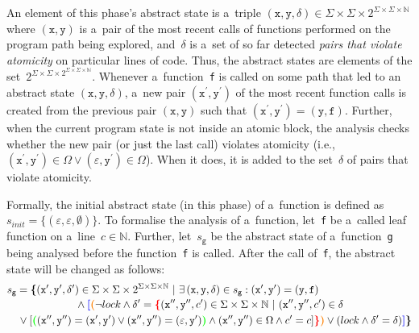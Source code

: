 An element of this phase's abstract state is a~triple $ (\mathtt{x}, \mathtt{y}, \delta) \in \Sigma \times \Sigma \times 2^{\Sigma \times \Sigma \times \mathbb{N}} $ where $ (\mathtt{x}, \mathtt{y}) $ is a~pair of the most recent calls of functions performed on the program path being explored, and~$ \delta $ is a~set of so far detected \emph{pairs that violate atomicity} on particular lines of code. Thus, the abstract states are elements of the set~$ 2^{\Sigma \times \Sigma \times 2^{\Sigma \times \Sigma \times \mathbb{N}}} $. Whenever a~function~\texttt{f} is called on some path that led to an abstract state $ (\mathtt{x}, \mathtt{y}, \delta) $, a~new pair $ (\mathtt{x}^\prime, \mathtt{y}^\prime) $ of the most recent function calls is created from the previous pair $ (\mathtt{x}, \mathtt{y}) $ such that $ (\mathtt{x}^\prime, \mathtt{y}^\prime) = (\mathtt{y}, \mathtt{f}) $. Further, when the current program state is not inside an atomic block, the analysis checks whether the new pair (or just the last call) violates atomicity (i.e., $ (\mathtt{x}^\prime, \mathtt{y}^\prime) \in \Omega \vee (\varepsilon, \mathtt{y}^\prime) \in \Omega $). When it does, it is added to the set~$ \delta $ of pairs that violate atomicity.

Formally, the initial abstract state (in this phase) of a~function is defined as $ s_{init} = \{(\varepsilon, \varepsilon, \emptyset)\} $. To formalise the analysis of a~function, let~\texttt{f} be a~called leaf function on a~line~$ c \in \mathbb{N} $. Further, let~$ s_\mathtt{g} $ be the abstract state of a~function~\texttt{g} being analysed before the function~\texttt{f} is called. After the call of~\texttt{f}, the abstract state will be changed as follows:
$$
\begin{multlined}
    s_\mathtt{g} = \bb{\{}(\mathtt{x}^\prime, \mathtt{y}^\prime, \delta^\prime) \in \Sigma \times \Sigma \times 2^{\Sigma \times \Sigma \times \mathbb{N}}\ |\ \exists\,(\mathtt{x}, \mathtt{y}, \delta) \in s_\mathtt{g} : (\mathtt{x}^\prime, \mathtt{y}^\prime) = (\mathtt{y}, \mathtt{f}) \\
%
    \wedge \bA{[}\bB{(}\neg lock \wedge \delta^\prime = \bC{\{}(\mathtt{x}^{\prime\prime}, \mathtt{y}^{\prime\prime}, c^\prime) \in \Sigma \times \Sigma \times \mathbb{N}\ |\ (\mathtt{x}^{\prime\prime}, \mathtt{y}^{\prime\prime}, c^\prime) \in \delta \\
%
    \vee [\bD{(}(\mathtt{x}^{\prime\prime}, \mathtt{y}^{\prime\prime}) = (\mathtt{x}^{\prime}, \mathtt{y}^\prime) \vee (\mathtt{x}^{\prime\prime}, \mathtt{y}^{\prime\prime}) = (\varepsilon, \mathtt{y}^\prime)\bD{)} \wedge (\mathtt{x}^{\prime\prime}, \mathtt{y}^{\prime\prime}) \in \Omega \wedge c^\prime = c]\bC{\}}\bB{)} \vee (lock \wedge \delta^\prime = \delta)%
%
    \bA{]}\bb{\}}
\end{multlined}
$$


